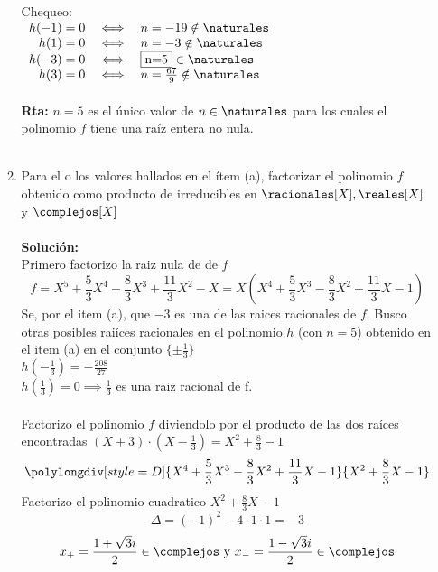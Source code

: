 \begin{enumerate}[label=\alph*)]
\begin{enumerate}[label=\alph*)]
Chequeo:\\
$
\begin{array}{rcl}
h(-1)=0 & \iff & n=-19 \notin \naturales \\
h(1)=0  & \iff & n=-3 \notin \naturales \\
h(-3)=0 & \iff & \fbox{n=5} \in \naturales \\
h(3)=0  & \iff & n=\frac{67}{9} \notin \naturales \\
\end{array}
$ \\
\\
\textbf{Rta:} $n=5$ es el único valor de $n\in\naturales$ para los cuales el polinomio $f$ tiene una raíz entera no nula.\\
\\
\item 
Para el o los valores hallados en el ítem (a), factorizar el polinomio $f$ obtenido como producto de irreducibles en $\racionales[X],\reales[X]$ y $\complejos[X]$ \\
\\
\textbf{Solución:}\\
Primero factorizo la raiz nula de de $f$ \\
$$
f=X^5 + \frac{5}{3}X^4 - \frac{8}{3}X^3 + \frac{11}{3}X^2 - X = 
X(X^4 + \frac{5}{3}X^3 - \frac{8}{3}X^2 + \frac{11}{3}X - 1)
$$
Se, por el item (a), que $-3$ es una de las raices racionales de $f$. Busco otras posibles raiíces racionales en el polinomio $h$ (con $n=5$) obtenido en el item (a) en el conjunto $\{ \pm\frac{1}{3} \}$ \\
$h(-\frac{1}{3})=-\frac{208}{27}$ \\
$h(\frac{1}{3})=0 \implies \frac{1}{3}$ es una raiz racional de f. \\
\\
Factorizo el polinomio $f$ diviendolo por el producto de las dos raíces encontradas $(X+3)\cdot(X-\frac{1}{3}) = X^2 + \frac{8}{3} - 1$
$$
\polylongdiv[style=D]{X^4 + \frac{5}{3}X^3 - \frac{8}{3}X^2 + \frac{11}{3}X - 1}{X^2 + \frac{8}{3}X - 1}
$$
Factorizo el polinomio cuadratico $X^2 + \frac{8}{3}X - 1$
$$ \Delta = (-1)^2 - 4 \cdot 1 \cdot 1=-3 $$
$$ x_+ = \frac{1 + \sqrt 3 i}{2} \in\complejos \text{ y } x_- = \frac{1 - \sqrt 3 i}{2} \in\complejos $$


\end{enumerate}
\end{enumerate}
